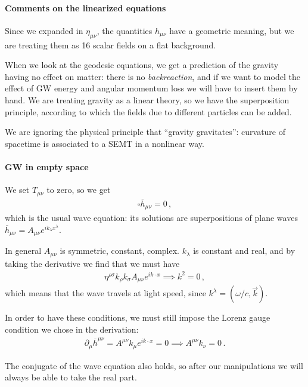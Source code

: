 \documentclass[main.tex]{subfiles}
\begin{document}
\paragraph{Comments on the linearized equations}

Since we expanded in \(\eta_{\mu \nu }\), the quantities \(h_{\mu \nu }\) have a geometric meaning, but we are treating them as 16 scalar fields on a flat background. 

When we look at the geodesic equations, we get a prediction of the gravity having no effect on matter: there is no \emph{backreaction}, and if we want to model the effect of GW energy and angular momentum loss we will have to insert them by hand. 
We are treating gravity as a linear theory, so we have the superposition principle, according to which the fields due to different particles can be added.

We are ignoring the physical principle that ``gravity gravitates'': curvature of spacetime is associated to a SEMT in a nonlinear way.

\paragraph{GW in empty space}

We set \(T_{\mu  \nu }\) to zero, so we get 
%
\begin{align}
\square \overline{h}_{\mu \nu } = 0
\,,
\end{align}
%
which is the usual wave equation: its solutions are superpositions of plane waves \(\overline{h}_{\mu \nu } = A_{\mu \nu } e^{i k_{\lambda }x^{\lambda }}\). 

In general \(A_{\mu \nu } \) is symmetric, constant, complex. \(k_{\lambda }\) is constant and real, and by taking the derivative we find that we must have
%
\begin{align}
\eta^{\rho \sigma } k_{\rho } k_{\sigma } A_{\mu \nu } e^{i k \cdot x } \implies k^2=0
\,,
\end{align}
%
which means that the wave travels at light speed, since \(k^{\lambda } = (\omega / c, \vec{k})\).

In order to have these conditions, we must still impose the Lorenz gauge condition we chose in the derivation:
%
\begin{align}
\partial_{\mu } \overline{h}^{\mu \nu } 
= A^{\mu \nu } k_{\mu } e^{i k \cdot x } = 0 
\implies A^{\mu \nu }k_{\nu } = 0
\,.
\end{align}

The conjugate of the wave equation also holds, so after our manipulations we will always be able to take the real part. 
\end{document}
